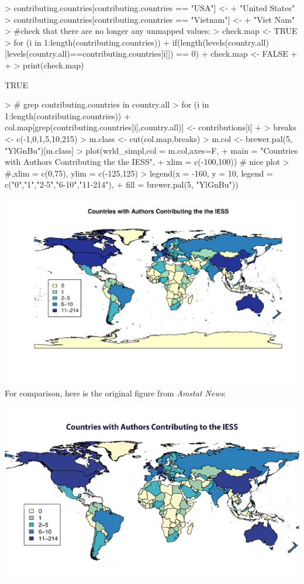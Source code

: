 \documentclass[12pt,letterpaper,final]{article}
\begin{document}
\begin{enumerate}
\begin{enumerate}
{\begin{Schunk}
\begin{Sinput}
> contributing.countries[contributing.countries == "USA"] <- 
+   "United States"
> contributing.countries[contributing.countries == "Vietnam"] <- 
+   "Viet Nam"
> #check that there are no longer any unmapped values:
> check.map <- TRUE
> for (i in 1:length(contributing.countries)){ 
+   if(length(levels(country.all)[levels(country.all)==contributing.countries[i]]) == 0){
+     check.map <- FALSE
+   }
+ }
> print(check.map)
\end{Sinput}
\begin{Soutput}
[1] TRUE
\end{Soutput}
\begin{Sinput}
> # grep contributing.countries in country.all
> for (i in 1:length(contributing.countries)){
+   col.map[grep(contributing.countries[i],country.all)] <- contributions[i]
+ }
> breaks <- c(-1,0,1,5,10,215)
> m.class <- cut(col.map,breaks)
> m.col <- brewer.pal(5, "YlGnBu")[m.class]
> plot(wrld_simpl,col = m.col,axes=F, 
+      main = "Countries with Authors Contributing the the IESS",
+      xlim = c(-100,100)) # nice plot
> #,xlim = c(0,75), ylim = c(-125,125)
> legend(x = -160, y = 10, legend = c("0","1","2-5","6-10","11-214"), 
+        fill = brewer.pal(5, "YlGnBu"))
\end{Sinput}
\end{Schunk}
\includegraphics{hw02_bartschi-001}
\\For comparison, here is the original figure from {\it Amstat News}:\\
\begin{center}
  \includegraphics[width=9.5 cm]{original_Contributor_map.png}
\end{center}
}



\end{enumerate}
\end{enumerate}
\end{document}
